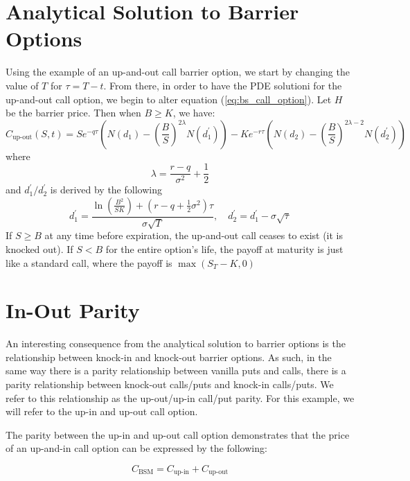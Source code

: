 \section{Analytical Solution to Barrier Options}

Using the example of an up-and-out call barrier option, we start by changing the value of $T$ for $\tau=T-t$. From there, in order to have the PDE solutioni for the up-and-out call option, we begin to alter equation (\ref{eq:bs_call_option}). Let $H$ be the barrier price. Then when $B\geq K$, we have:
\begin{equation}\label{eq:UOC}
	C_{\text{up-out}}(S,t)=Se^{-q\tau}\left(N(d_1)-\left(\frac{B}{S}\right)^{2\lambda}N(d^\prime_1)\right)-Ke^{-r\tau}\left(N(d_2)-\left(\frac{B}{S}\right)^{2\lambda-2} N(d^\prime_2)\right)
\end{equation}
where
\begin{equation}
	\lambda=\frac{r-q}{\sigma^2}+\frac{1}{2}
\end{equation}
and $d^\prime_1/d^\prime_2$ is derived by the following
\begin{equation}
	d^\prime_1=\frac{\ln\left(\frac{B^2}{SK}\right)+(r-q+\tfrac{1}{2}\sigma^2)\tau}{\sigma\sqrt{T}},\quad d^\prime_2=d^\prime_1-\sigma\sqrt{\tau}
\end{equation}
If $S\geq B$ at any time before expiration, the up-and-out call ceases to exist (it is knocked out). If $S<B$ for the entire option's life, the payoff at maturity is just like a standard call, where the payoff is $\max\left(S_T-K, 0\right)$
\section{In-Out Parity}

An interesting consequence from the analytical solution to barrier options is the relationship between knock-in and knock-out barrier options. As such, in the same way there is a parity relationship between vanilla puts and calls, there is a parity relationship between knock-out calls/puts and knock-in calls/puts. We refer to this relationship as the up-out/up-in call/put parity. For this example, we will refer to the up-in and up-out call option.

The parity between the up-in and up-out call option demonstrates that the price of an up-and-in call option can be expressed by the following:

\begin{equation}\label{eq:parity}
	C_{\text{BSM}}=C_{\text{up-in}}+C_{\text{up-out}}
\end{equation}

